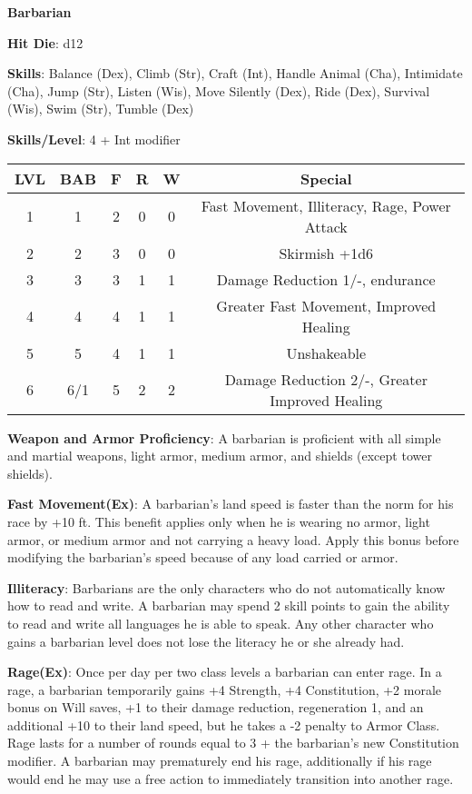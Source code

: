 \textbf{\huge{Barbarian}}

\textbf{Hit Die}: d12

\textbf{Skills}: Balance (Dex), Climb (Str), Craft (Int), Handle Animal (Cha), Intimidate (Cha), Jump (Str), Listen (Wis), Move Silently (Dex), Ride (Dex), Survival (Wis), Swim (Str), Tumble (Dex)

\textbf{Skills/Level}: 4 + Int modifier

\begin{center}
\begin{small}
\begin{tabular}{| c | c | c | c | c | c |}
\hline
LVL &BAB &F &R &W &Special \\
\hline
1 &1 &2 &0 &0 &Fast Movement, Illiteracy, Rage, Power Attack \\
2 &2 &3 &0 &0 &Skirmish +1d6 \\
3 &3 &3 &1 &1 &Damage Reduction 1/-, endurance \\
4 &4 &4 &1 &1 &Greater Fast Movement, Improved Healing \\
5 &5 &4 &1 &1 &Unshakeable \\
6 &6/1 &5 &2 &2 &Damage Reduction 2/-, Greater Improved Healing \\
\hline
\end{tabular}
\end{small}
\end{center}

\textbf{Weapon and Armor Proficiency}: A barbarian is proficient with all simple and martial weapons, light armor, medium armor, and shields (except tower shields).

\textbf{Fast Movement(Ex)}: A barbarian's land speed is faster than the norm for his race by +10 ft. This benefit applies only when he is wearing no armor, light armor, or medium armor and not carrying a heavy load. Apply this bonus before modifying the barbarian's speed because of any load carried or armor.

\textbf{Illiteracy}: Barbarians are the only characters who do not automatically know how to read and write. A barbarian may spend 2 skill points to gain the ability to read and write all languages he is able to speak. Any other character who gains a barbarian level does not lose the literacy he or she already had.

\textbf{Rage(Ex)}: Once per day per two class levels a barbarian can enter rage. In a rage, a barbarian temporarily gains +4 Strength, +4 Constitution, +2 morale bonus on Will saves, +1 to their damage reduction, regeneration 1, and an additional +10 to their land speed, but he takes a -2 penalty to Armor Class. Rage lasts for a number of rounds equal to 3 + the barbarian's new Constitution modifier. A barbarian may prematurely end his rage, additionally if his rage would end he may use a free action to immediately transition into another rage.

